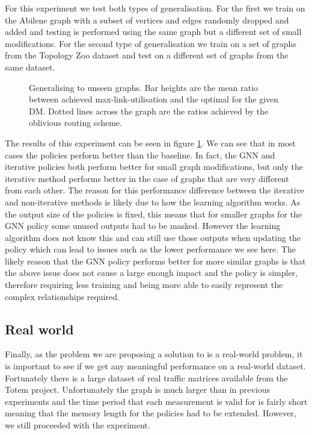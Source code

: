 For this experiment we test both types of generalisation. For the first we train on the Abilene graph with a subset of vertices and edges randomly dropped and added and testing is performed using the same graph but a different set of small modifications. For the second type of generalisation we train on a set of graphs from the Topology Zoo dataset and test on a different set of graphs from the same dataset.

\begin{figure}
    \centering
    
    \caption{Generalising to unseen graphs. Bar heights are the mean ratio between achieved max-link-utilisation and the optimal for the given DM. Dotted lines across the graph are the ratios achieved by the oblivious routing scheme.}
    \label{fig:exp_graphs}
\end{figure}

The results of this experiment can be seen in figure \ref{fig:exp_graphs}. We can see that in most cases the policies perform better than the baseline. In fact, the GNN and iterative policies both perform better for small graph modifications, but only the iterative method performs better in the case of graphs that are very different from each other. The reason for this performance difference between the iterative and non-iterative methods is likely due to how the learning algorithm works. As the output size of the policies is fixed, this means that for smaller graphs for the GNN policy some unused outputs had to be masked. However the learning algorithm does not know this and can still use those outputs when updating the policy which can lead to issues such as the lower performance we see here. The likely reason that the GNN policy performs better for more similar graphs is that the above issue does not cause a large enough impact and the policy is simpler, therefore requiring less training and being more able to easily represent the complex relationships required.

\subsection{Real world}
Finally, as the problem we are proposing a solution to is a real-world problem, it is important to see if we get any meaningful performance on a real-world dataset. Fortunately there is a large dataset of real traffic matrices available from the Totem\cite{uhlig2006providing} project. Unfortunately the graph is much larger than in previous experiments and the time period that each measurement is valid for is fairly short meaning that the memory length for the policies had to be extended. However, we still proceeded with the experiment.


